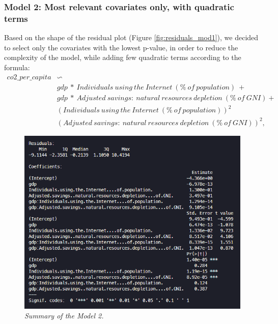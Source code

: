 \documentclass{article}
\begin{document}
	\subsubsection{Model 2: Most relevant covariates only, with quadratic terms}
	Based on the shape of the residual plot (Figure \ref{fig:residuals_mod1}), we decided to select only the covariates with the lowest p-value, in order to reduce the complexity of the model, while adding few quadratic terms according to the formula:
	\begin{align}
		\nonumber co2\_per\_capita &\backsim \\
		\nonumber &gdp\ *\ Individuals\ using\ the\ Internet\ (\%\ of\ population)\ +\\
		\nonumber &gdp\ *\ Adjusted\ savings:\ natural\ resources\ depletion\ (\%\ of\ GNI)+\\
		\nonumber &(Individuals\ using\ the\ Internet\ (\%\ of\ population) )^2\\ 
		\nonumber &(Adjusted\ savings:\ natural\ resources\ depletion\ (\%\ of\ GNI))^2, 
	\end{align}
	\begin{figure} 
		\centering
		\includegraphics[width=1\linewidth]{summary_mod2.png}
		\caption{\textit{Summary of the Model 2.}}
		\label{fig:summary_mod2}
	\end{figure}
\end{document}
